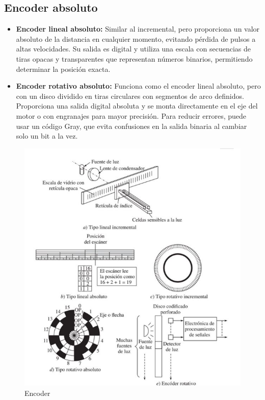 \subsection*{Encoder absoluto}
\begin{itemize}
	\item \textbf{Encoder lineal absoluto: } Similar al incremental, pero proporciona un valor absoluto de la distancia en cualquier momento, evitando pérdida de pulsos a altas velocidades. Su salida es digital y utiliza una escala con secuencias de tiras opacas y transparentes que representan números binarios, permitiendo determinar la posición exacta.
	\item \textbf{Encoder rotativo absoluto: } Funciona como el encoder lineal absoluto, pero con un disco dividido en tiras circulares con segmentos de arco definidos. Proporciona una salida digital absoluta y se monta directamente en el eje del motor o con engranajes para mayor precisión. Para reducir errores, puede usar un código Gray, que evita confusiones en la salida binaria al cambiar solo un bit a la vez.
	
\end{itemize}


\begin{figure}
	\centering
	\includegraphics[width=0.7\linewidth]{img/Encoder}
	\caption{Encoder}
	\label{fig:encoder}
\end{figure}


\vspace{15cm}

